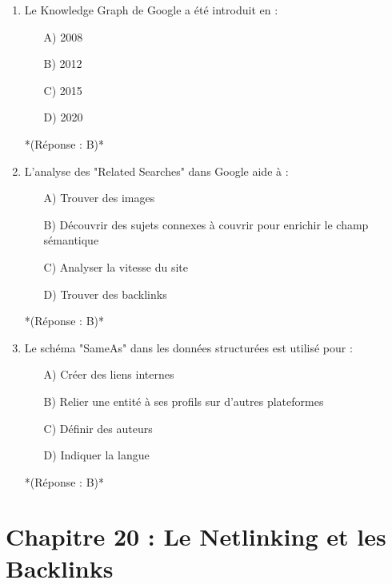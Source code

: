 \documentclass[12pt,a4paper,twoside]{report}
\begin{document}
\begin{enumerate}
\item Le Knowledge Graph de Google a été introduit en :
\begin{itemize}
\item[A)] 2008
\item[B)] 2012
\item[C)] 2015
\item[D)] 2020
\end{itemize}
*(Réponse : B)*

\item L'analyse des "Related Searches" dans Google aide à :
\begin{itemize}
\item[A)] Trouver des images
\item[B)] Découvrir des sujets connexes à couvrir pour enrichir le champ sémantique
\item[C)] Analyser la vitesse du site
\item[D)] Trouver des backlinks
\end{itemize}
*(Réponse : B)*

\item Le schéma "SameAs" dans les données structurées est utilisé pour :
\begin{itemize}
\item[A)] Créer des liens internes
\item[B)] Relier une entité à ses profils sur d'autres plateformes
\item[C)] Définir des auteurs
\item[D)] Indiquer la langue
\end{itemize}
*(Réponse : B)*
\end{enumerate}
\section*{Chapitre 20 : Le Netlinking et les Backlinks}
\end{document}
